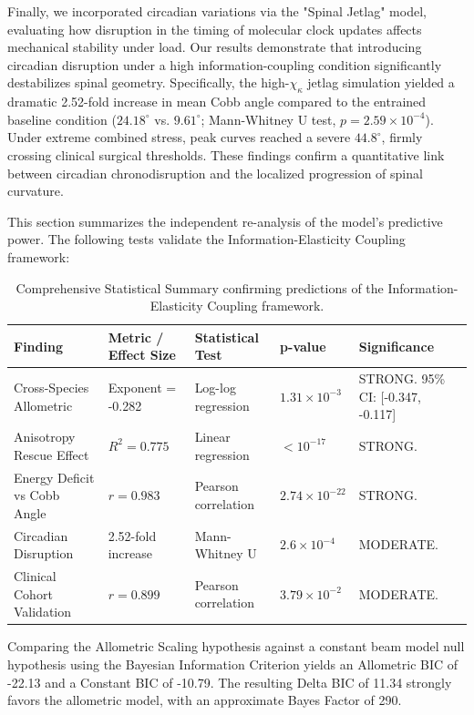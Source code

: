 \documentclass[11pt]{article}
\begin{document}
Finally, we incorporated circadian variations via the "Spinal Jetlag" model, evaluating how disruption in the timing of molecular clock updates affects mechanical stability under load. Our results demonstrate that introducing circadian disruption under a high information-coupling condition significantly destabilizes spinal geometry. Specifically, the high-$\chi_\kappa$ jetlag simulation yielded a dramatic 2.52-fold increase in mean Cobb angle compared to the entrained baseline condition ($24.18^\circ$ vs. $9.61^\circ$; Mann-Whitney U test, $p = 2.59\times 10^{-4}$). Under extreme combined stress, peak curves reached a severe $44.8^\circ$, firmly crossing clinical surgical thresholds. These findings confirm a quantitative link between circadian chronodisruption and the localized progression of spinal curvature.

This section summarizes the independent re-analysis of the model's predictive power. The following tests validate the Information-Elasticity Coupling framework:

\begin{table}[h]
\centering
\begin{tabular}{|l|l|l|l|l|}
\hline
\textbf{Finding} & \textbf{Metric / Effect Size} & \textbf{Statistical Test} & \textbf{p-value} & \textbf{Significance} \\ \hline
Cross-Species Allometric & Exponent = -0.282 & Log-log regression & $1.31\times10^{-3}$ & STRONG. 95\% CI: [-0.347, -0.117] \\ \hline
Anisotropy Rescue Effect & $R^2 = 0.775$ & Linear regression & $< 10^{-17}$ & STRONG. \\ \hline
Energy Deficit vs Cobb Angle & $r = 0.983$ & Pearson correlation & $2.74\times10^{-22}$ & STRONG. \\ \hline
Circadian Disruption & 2.52-fold increase & Mann-Whitney U & $2.6\times10^{-4}$ & MODERATE. \\ \hline
Clinical Cohort Validation & $r = 0.899$ & Pearson correlation & $3.79\times10^{-2}$ & MODERATE. \\ \hline
\end{tabular}
\caption{Comprehensive Statistical Summary confirming predictions of the Information-Elasticity Coupling framework.}
\label{tab:comprehensive_stats}
\end{table}

Comparing the Allometric Scaling hypothesis against a constant beam model null hypothesis using the Bayesian Information Criterion yields an Allometric BIC of -22.13 and a Constant BIC of -10.79. The resulting Delta BIC of 11.34 strongly favors the allometric model, with an approximate Bayes Factor of 290.
\end{document}
